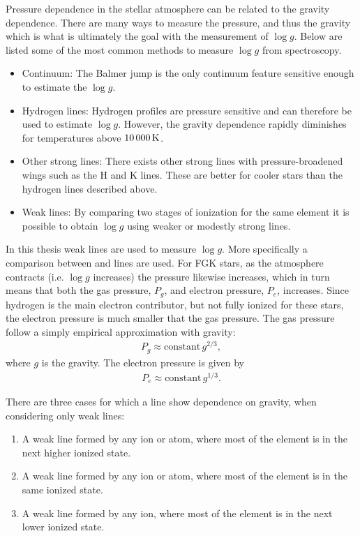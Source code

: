 Pressure dependence in the stellar atmosphere can be related to the gravity dependence. There are
many ways to measure the pressure, and thus the gravity which is what is ultimately the goal with
the measurement of $\log g$. Below are listed some of the most common methods to measure $\log g$
from spectroscopy.

\begin{itemize}
  \item Continuum: The Balmer jump is the only continuum feature sensitive enough to estimate the
        $\log g$.
  \item Hydrogen lines: Hydrogen profiles are pressure sensitive and can therefore be used to
        estimate $\log g$. However, the gravity dependence rapidly diminishes for temperatures above
        $\SI{10\,000}{K}$.
  \item Other strong lines: There exists other strong lines with pressure-broadened wings such as
        the  H and K lines. These are better for cooler stars than the hydrogen lines
        described above.
  \item Weak lines: By comparing two stages of ionization for the same element it is possible to
        obtain $\log g$ using weaker or modestly strong lines.
\end{itemize}
In this thesis weak lines are used to measure $\log g$. More specifically a comparison between
 and  lines are used. For FGK stars, as the atmosphere contracts (i.e. $\log
g$ increases) the pressure likewise increases, which in turn means that both the gas pressure,
$P_g$, and electron pressure, $P_e$, increases. Since hydrogen is the main electron contributor, but
not fully ionized for these stars, the electron pressure is much smaller that the gas pressure. The
gas pressure follow a simply empirical approximation with gravity:
\begin{align}
  P_g \approx \mathrm{constant}\, g^{2/3},
\end{align}
where $g$ is the gravity. The electron pressure is given by
\begin{align}
  P_e \approx \mathrm{constant}\, g^{1/3}.
\end{align}

There are three cases for which a line show dependence on gravity, when considering only weak lines:
\begin{enumerate}
  \item A weak line formed by any ion or atom, where most of the element is in the next higher ionized state.
  \item A weak line formed by any ion or atom, where most of the element is in the same ionized state.
  \item A weak line formed by any ion, where most of the element is in the next lower ionized state.
\end{enumerate}

